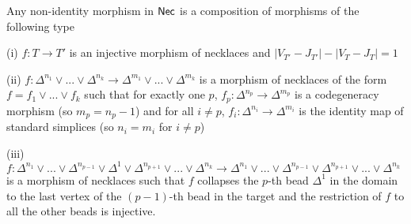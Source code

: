 \begin{proposition} Any non-identity morphism in $\mathsf{Nec}$ is a composition of morphisms of the following type
\begin{item}
\item (i)  $f: T \to T'$ is an injective morphism of necklaces and $ |V_{T'}-J_{T'}|-|V_T-J_T| =1$
\\
\item (ii) $f: \Delta^{n_1} \vee ... \vee \Delta^{n_k} \to \Delta^{m_1} \vee ... \vee \Delta^{m_k}$ is a morphism of necklaces of the form $f=f_1 \vee ... \vee f_k$ such that for exactly one $p$, $f_p: \Delta^{n_p} \to \Delta^{m_p}$ is a codegeneracy morphism (so $m_p=n_p-1$) and for all $i \neq p$, $f_i: \Delta^{n_i}  \to \Delta^{m_i}$ is the identity map of standard simplices (so $n_i=m_i$ for $i \neq p$)
\\
\item (iii) $f: \Delta^{n_1} \vee ...\vee \Delta^{n_{p-1}} \vee \Delta^1 \vee \Delta^{n_{p+1}} \vee... \vee  \Delta^{n_k} \to \Delta^{n_1} \vee ...\vee \Delta^{n_{p-1}} \vee \Delta^{n_{p+1}} \vee... \vee  \Delta^{n_k}$ is a morphism of necklaces such that $f$ collapses the $p$-th bead $\Delta^1$  in the domain to the last vertex of the $(p-1)$-th bead in the target and the restriction of $f$ to all the other beads is injective. 
\end{item}
\end{proposition}


